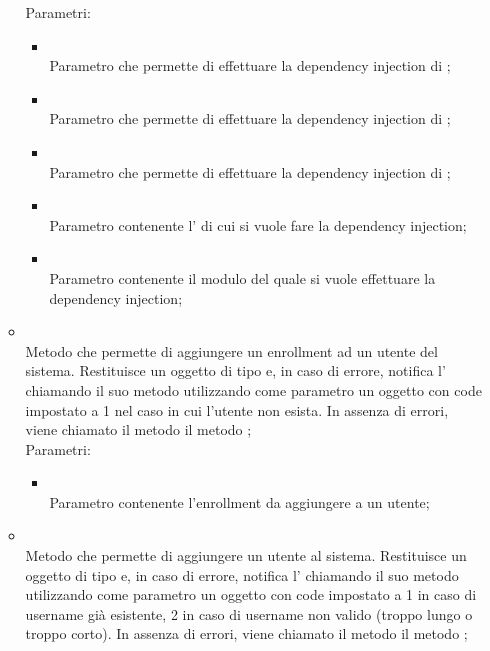 \begin{itemize}
\begin{itemize}
		Parametri:
		\begin{itemize}
			\item {} \\
			Parametro che permette di effettuare la dependency injection di ;
			\item {} \\
			Parametro che permette di effettuare la dependency injection di ;
			\item {} \\
			Parametro che permette di effettuare la dependency injection di ;
			\item {} \\
			Parametro contenente l' di cui si vuole fare la dependency injection;
			\item {} \\
			Parametro contenente il modulo  del quale si vuole effettuare la dependency injection;
		\end{itemize}
		\item[]  \\		Metodo che permette di aggiungere un enrollment ad un utente del sistema. Restituisce un oggetto di tipo  e, in caso di errore, notifica l' chiamando il suo metodo  utilizzando come parametro un oggetto  con code impostato a 1 nel caso in cui l'utente non esista. In assenza di errori, viene chiamato il metodo il metodo ;\\
		Parametri:
		\begin{itemize}
			\item {} \\
			Parametro contenente l'enrollment da aggiungere a un utente;
		\end{itemize}
		\item[]  \\		Metodo che permette di aggiungere un utente al sistema. Restituisce un oggetto di tipo  e, in caso di errore, notifica l' chiamando il suo metodo  utilizzando come parametro un oggetto  con code impostato a 1 in caso di username già esistente, 2 in caso di username non valido (troppo lungo o troppo corto). In assenza di errori, viene chiamato il metodo il metodo ;\\

\end{itemize}
\end{itemize}
